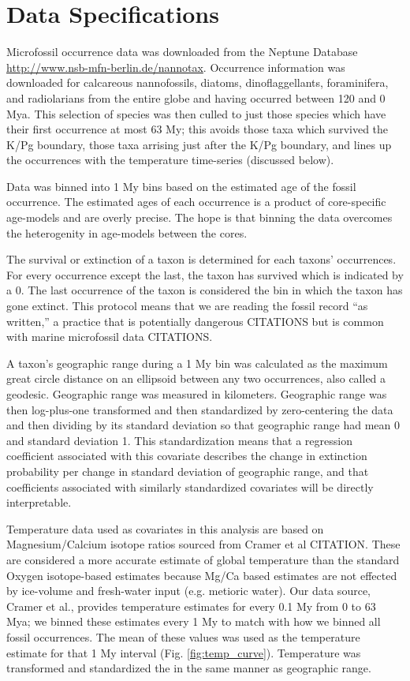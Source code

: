 \documentclass[12pt,letterpaper]{article}
\begin{document}
\section{Data Specifications}

Microfossil occurrence data was downloaded from the Neptune Database \url{http://www.nsb-mfn-berlin.de/nannotax}. Occurrence information was downloaded for calcareous nannofossils, diatoms, dinoflaggellants, foraminifera, and radiolarians from the entire globe and having occurred between 120 and 0 Mya. This selection of species was then culled to just those species which have their first occurrence at most 63 My; this avoids those taxa which survived the K/Pg boundary, those taxa arrising just after the K/Pg boundary, and lines up the occurrences with the temperature time-series (discussed below).

Data was binned into 1 My bins based on the estimated age of the fossil occurrence. The estimated ages of each occurrence is a product of core-specific age-models and are overly precise. The hope is that binning the data overcomes the heterogenity in age-models between the cores. 

The survival or extinction of a taxon is determined for each taxons' occurrences. For every occurrence except the last, the taxon has survived which is indicated by a 0. The last occurrence of the taxon is considered the bin in which the taxon has gone extinct. This protocol means that we are reading the fossil record ``as written,'' a practice that is potentially dangerous CITATIONS but is common with marine microfossil data CITATIONS.

A taxon's geographic range during a 1 My bin was calculated as the maximum great circle distance on an ellipsoid between any two occurrences, also called a geodesic. Geographic range was measured in kilometers. Geographic range was then log-plus-one transformed and then standardized by zero-centering the data and then dividing by its standard deviation so that geographic range had mean 0 and standard deviation 1. This standardization means that a regression coefficient associated with this covariate describes the change in extinction probability per change in standard deviation of geographic range, and that coefficients associated with similarly standardized covariates will be directly interpretable.

Temperature data used as covariates in this analysis are based on Magnesium/Calcium isotope ratios sourced from Cramer et al CITATION. These are considered a more accurate estimate of global temperature than the standard Oxygen isotope-based estimates because Mg/Ca based estimates are not effected by ice-volume and fresh-water input (e.g. metioric water). Our data source, Cramer et al., provides temperature estimates for every 0.1 My from 0 to 63 Mya; we binned these estimates every 1 My to match with how we binned all fossil occurrences. The mean of these values was used as the temperature estimate for that 1 My interval (Fig. \ref{fig:temp_curve}). Temperature was transformed and standardized the in the same manner as geographic range.
\end{document}
